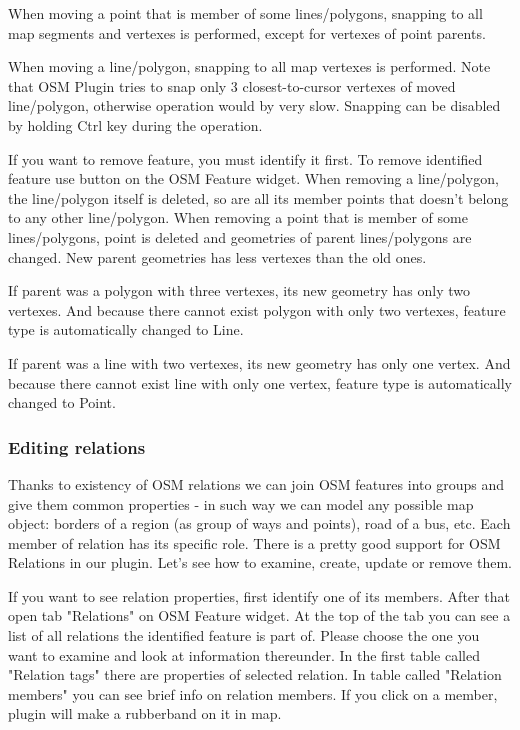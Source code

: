 When moving a point that is member of some lines/polygons, snapping to all
map segments and vertexes is performed, except for vertexes of point parents.

When moving a line/polygon, snapping to all map vertexes is performed. Note
that OSM Plugin tries to snap only 3 closest-to-cursor vertexes of moved
line/polygon, otherwise operation would by very slow.
Snapping can be disabled by holding Ctrl key during the operation.


If you want to remove feature, you must identify it first. To remove 
identified feature use  button 
on the OSM Feature widget. When removing a line/polygon, the line/polygon 
itself is deleted, so are all its member points that doesn't belong to any 
other line/polygon. When removing a point that is member of some 
lines/polygons, point is deleted and geometries of parent lines/polygons 
are changed. New parent geometries has less vertexes than the old ones.

If parent was a polygon with three vertexes, its new geometry has only two
vertexes. And because there cannot exist polygon with only two vertexes,
feature type is automatically changed to Line.

If parent was a line with two vertexes, its new geometry has only one vertex.
And because there cannot exist line with only one vertex, feature type is
automatically changed to Point.

\subsubsection{Editing relations}\label{editing_osm_relation}

Thanks to existency of OSM relations we can join OSM features into groups and
give them common properties - in such way we can model any possible map
object: borders of a region (as group of ways and points), road of a bus,
etc. Each member of relation has its specific role.
There is a pretty good support for OSM Relations in our plugin.
Let's see how to examine, create, update or remove them.


If you want to see relation properties, first identify one of its members.
After that open tab "Relations" on OSM Feature widget. At the top of the tab
you can see a list of all relations the identified feature is part of. Please
choose the one you want to examine and look at information thereunder.
In the first table called "Relation tags" there are properties of selected
relation.
In table called "Relation members" you can see brief info on relation
members.
If you click on a member, plugin will make a rubberband on it in map.

